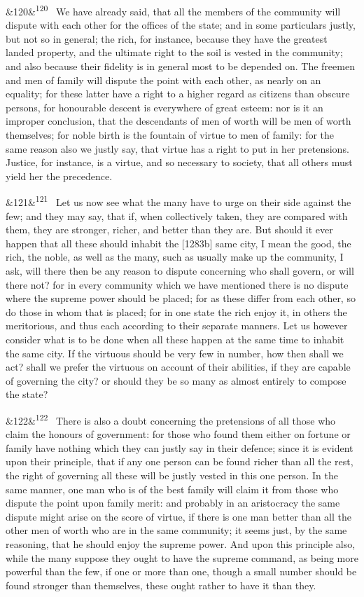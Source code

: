 \documentclass[12pt]{article}
\newcommand{\para}[1][]{\par\noindent\ifx&#1&\else\textsuperscript{\footnotesize #1}~\fi}
\begin{document}
\para[120] We have already said, that all the members of the community will dispute with each other for the offices of the state; and in some particulars justly, but not so in general; the rich, for instance, because they have the greatest landed property, and the ultimate right to the soil is vested in the community; and also because their fidelity is in general most to be depended on. The freemen and men of family will dispute the point with each other, as nearly on an equality; for these latter have a right to a higher regard as citizens than obscure persons, for honourable descent is everywhere of great esteem: nor is it an improper conclusion, that the descendants of men of worth will be men of worth themselves; for noble birth is the fountain of virtue to men of family: for the same reason also we justly say, that virtue has a right to put in her pretensions. Justice, for instance, is a virtue, and so necessary to society, that all others must yield her the precedence.

\para[121] Let us now see what the many have to urge on their side against the few; and they may say, that if, when collectively taken, they are compared with them, they are stronger, richer, and better than they are. But should it ever happen that all these should inhabit the [1283b] same city, I mean the good, the rich, the noble, as well as the many, such as usually make up the community, I ask, will there then be any reason to dispute concerning who shall govern, or will there not? for in every community which we have mentioned there is no dispute where the supreme power should be placed; for as these differ from each other, so do those in whom that is placed; for in one state the rich enjoy it, in others the meritorious, and thus each according to their separate manners. Let us however consider what is to be done when all these happen at the same time to inhabit the same city. If the virtuous should be very few in number, how then shall we act? shall we prefer the virtuous on account of their abilities, if they are capable of governing the city? or should they be so many as almost entirely to compose the state?

\para[122] There is also a doubt concerning the pretensions of all those who claim the honours of government: for those who found them either on fortune or family have nothing which they can justly say in their defence; since it is evident upon their principle, that if any one person can be found richer than all the rest, the right of governing all these will be justly vested in this one person. In the same manner, one man who is of the best family will claim it from those who dispute the point upon family merit: and probably in an aristocracy the same dispute might arise on the score of virtue, if there is one man better than all the other men of worth who are in the same community; it seems just, by the same reasoning, that he should enjoy the supreme power. And upon this principle also, while the many suppose they ought to have the supreme command, as being more powerful than the few, if one or more than one, though a small number should be found stronger than themselves, these ought rather to have it than they.
\end{document}

